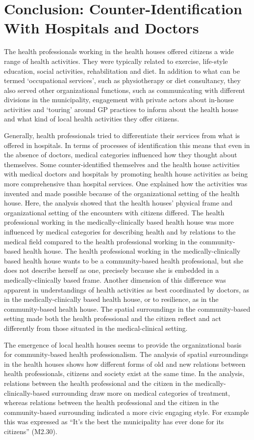 \chapter{Conclusion: Counter-Identification With Hospitals and Doctors}
The health professionals working in the health houses offered citizens a wide range of health activities. They were typically related to exercise, life-style education, social activities, rehabilitation and diet. In addition to what can be termed ‘occupational services’, such as physiotherapy or diet consultancy, they also served other organizational functions, such as communicating with different divisions in the municipality, engagement with private actors about in-house activities and ‘touring’ around GP practices to inform about the health house and what kind of local health activities they offer citizens.
\par
Generally, health professionals tried to differentiate their services from what is offered in hospitals. In terms of processes of identification this means that even in the absence of doctors, medical categories influenced how they thought about themselves. Some counter-identified themselves and the health house activities with medical doctors and hospitals by promoting health house activities as being more comprehensive than hospital services. One explained how the activities was invented and made possible because of the organizational setting of the health house. Here, the analysis showed that the health houses’ physical frame and organizational setting of the encounters with citizens differed. The health professional working in the medically-clinically based health house was more influenced by medical categories for describing health and by relations to the medical field compared to the health professional working in the community-based health house. The health professional working in the medically-clinically based health house wants to be a community-based health professional, but she does not describe herself as one, precisely because she is embedded in a medically-clinically based frame. Another dimension of this difference was apparent in understandings of health activities as best coordinated by doctors, as in the medically-clinically based health house, or to resilience, as in the community-based health house. The spatial surroundings in the community-based setting made both the health professional and the citizen reflect and act differently from those situated in the medical-clinical setting.
\par
The emergence of local health houses seems to provide the organizational basis for community-based health professionalism. The analysis of spatial surroundings in the health houses shows how different forms of old and new relations between health professionals, citizens and society exist at the same time. In the analysis, relations between the health professional and the citizen in the medically-clinically-based surrounding draw more on medical categories of treatment, whereas relations between the health professional and the citizen in the community-based surrounding indicated a more civic engaging style. For example this was expressed as “It's the best the municipality has ever done for its citizens” (M2.30).
